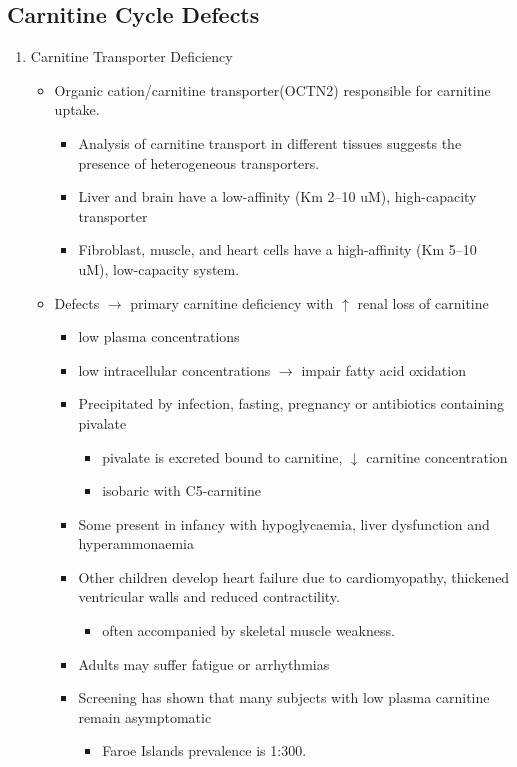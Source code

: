 \documentclass{scrartcl}
\begin{document}
\subsection{Carnitine Cycle Defects}
\label{sec:org933031e}
\begin{enumerate}
\item Carnitine Transporter Deficiency
\label{sec:org894821a}
\begin{itemize}
\item Organic cation/carnitine transporter(OCTN2) responsible for
carnitine uptake. 
\begin{itemize}
\item Analysis of carnitine transport in different tissues suggests the
presence of heterogeneous transporters.
\item Liver and brain have a low-affinity (Km 2–10 uM), high-capacity transporter
\item Fibroblast, muscle, and heart cells have a high-affinity (Km 5–10 uM), low-capacity system.
\end{itemize}
\item Defects \(\to\) primary carnitine deficiency with \(\uparrow\) renal loss of carnitine
\begin{itemize}
\item low plasma concentrations
\item low intracellular concentrations \(\to\) impair fatty acid oxidation
\end{itemize}
\begin{itemize}
\item Precipitated by infection, fasting, pregnancy or antibiotics containing pivalate
\begin{itemize}
\item pivalate is excreted bound to carnitine, \(\downarrow\) carnitine concentration
\item isobaric with C5-carnitine
\end{itemize}
\item Some present in infancy with hypoglycaemia, liver dysfunction and hyperammonaemia
\item Other children develop heart failure due to cardiomyopathy,
thickened ventricular walls and reduced contractility.
\begin{itemize}
\item often accompanied by skeletal muscle weakness.
\end{itemize}
\item Adults may suffer fatigue or arrhythmias
\item Screening has shown that many subjects with low plasma carnitine remain asymptomatic
\begin{itemize}
\item Faroe Islands prevalence is 1:300.
\end{itemize}
\end{itemize}
\end{itemize}


\end{enumerate}
\end{document}
